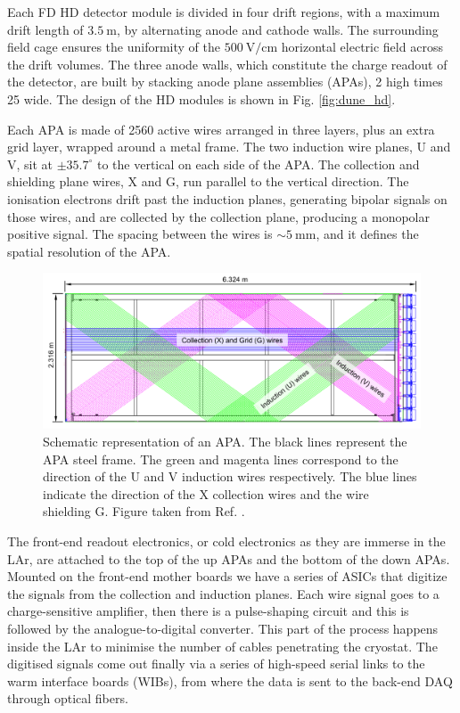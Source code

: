 Each FD HD detector module is divided in four drift regions, with a maximum drift length of $3.5~\mathrm{m}$, by alternating anode and cathode walls. The surrounding field cage ensures the uniformity of the $500~\mathrm{V/cm}$ horizontal electric field across the drift volumes. The three anode walls, which constitute the charge readout of the detector, are built by stacking anode plane assemblies (APAs), 2 high times 25 wide. The design of the HD modules is shown in Fig. \ref{fig:dune_hd}.

Each APA is made of 2560 active wires arranged in three layers, plus an extra grid layer, wrapped around a metal frame. The two induction wire planes, U and V, sit at $\pm 35.7^{\circ}$ to the vertical on each side of the APA. The collection and shielding plane wires, X and G, run parallel to the vertical direction. The ionisation electrons drift past the induction planes, generating bipolar signals on those wires, and are collected by the collection plane, producing a monopolar positive signal. The spacing between the wires is $\sim 5~\mathrm{mm}$, and it defines the spatial resolution of the APA.

\begin{figure}[t]
	\centering
	\includegraphics[width=1\linewidth]{Images/DUNE/FD/APA_wires}
	\caption[Schematic representation of an APA frames showing the U, V, X and G wires.]{Schematic representation of an APA. The black lines represent the APA steel frame. The green and magenta lines correspond to the direction of the U and V induction wires respectively. The blue lines indicate the direction of the X collection wires and the wire shielding G. Figure taken from Ref. \cite{DUNE2020TDR1}.}
	\label{fig:apa}
\end{figure}

The front-end readout electronics, or cold electronics as they are immerse in the LAr, are attached to the top of the up APAs and the bottom of the down APAs. Mounted on the front-end mother boards we have a series of ASICs that digitize the signals from the collection and induction planes. Each wire signal goes to a charge-sensitive amplifier, then there is a pulse-shaping circuit and this is followed by the analogue-to-digital converter. This part of the process happens inside the LAr to minimise the number of cables penetrating the cryostat. The digitised signals come out finally via a series of high-speed serial links to the warm interface boards (WIBs), from where the data is sent to the back-end DAQ through optical fibers.


